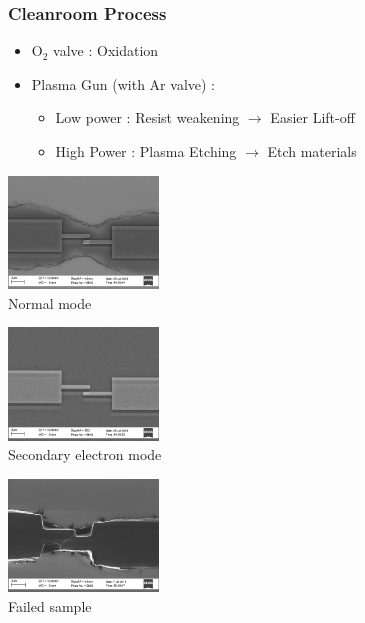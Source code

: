 \documentclass[handout]{beamer}
\begin{document}
    \begin{frame}
        \frametitle{Cleanroom Process}
        \begin{itemize}
        \item O$_2$ valve : Oxidation
        \item Plasma Gun (with Ar valve) : \begin{itemize}
            \item Low power : Resist weakening $\rightarrow$ Easier Lift-off
            \item High Power : Plasma Etching $\rightarrow$ Etch materials
        \end{itemize}
        \end{itemize}
        
        \begin{multicols}{3}
             \begin{center}            
            \includegraphics[width=40mm]{SEMexemple.jpg}\\
            {\scriptsize Normal mode} 
            \end{center}
            
            \begin{center}
            \includegraphics[width=40mm]{SEMexemplese2.jpg}\\
             {\scriptsize Secondary electron mode}
             \end{center}
                          
            \begin{center}
            \includegraphics[width=40mm]{SEMexemplefail.jpg}\\
            {\scriptsize Failed sample}
            \end{center}
        \end{multicols}
        
    \end{frame}
    
\end{document}

